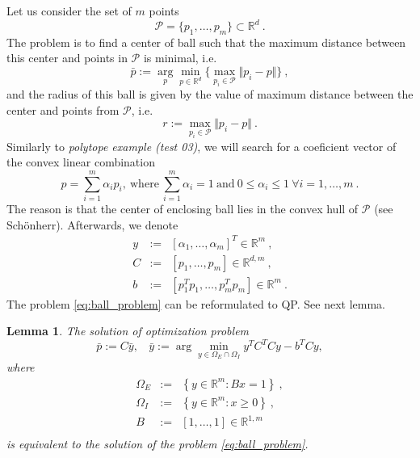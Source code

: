 \documentclass{article}
\theoremstyle{lemma}
\newtheorem{lemma}{Lemma}
\begin{document}
Let us consider the set of $m$ points
\begin{displaymath}
 \mathcal{P} = \lbrace p_1, \dots, p_m \rbrace \subset \mathbb{R}^d ~\mathrm{.}
\end{displaymath}
The problem is to find a center of ball such that the maximum distance between this center and points in $\mathcal{P}$ is minimal, i.e.
\begin{equation}
 \label{eq:ball_problem}
 \bar{p} := \underset{p}{\arg} \min\limits_{p \in \mathbb{R}^d} \lbrace \max\limits_{p_i \in \mathcal{P}} \Vert p_i - p \Vert  \rbrace ~\mathrm{,}
\end{equation}
and the radius of this ball is given by the value of maximum distance between the center and points from $\mathcal{P}$, i.e.
\begin{displaymath}
 r := \max\limits_{p_i \in \mathcal{P}} \Vert p_i - p \Vert ~\mathrm{.}
\end{displaymath}
Similarly to \emph{polytope example (test 03)}, we will search for a coeficient vector of the convex linear combination 
\begin{displaymath}
 p = \sum\limits_{i = 1}^{m} \alpha_{i} p_i, ~ \mathrm{where} ~ \sum\limits_{i = 1}^{m} \alpha_i = 1 ~ \mathrm{and} ~ 0 \leq \alpha_i \leq 1 ~\forall i = 1,\dots,m  ~\mathrm{.}
\end{displaymath}
The reason is that the center of enclosing ball lies in the convex hull of $\mathcal{P}$ (see Sch\"{o}nherr). \newline
Afterwards, we denote
\begin{displaymath}
 \begin{array}{rcl}
  y & := & [\alpha_1, \dots, \alpha_m]^T \in \mathbb{R}^{m} ~\mathrm{,} \\
  C & := & [p_1,\dots,p_m] \in \mathbb{R}^{d,m} ~\mathrm{,} \\
  b & := & [p_1^T p_1, \dots, p_m^T p_m]  \in \mathbb{R}^{m} ~\mathrm{.} 
 \end{array}
\end{displaymath}
The problem \eqref{eq:ball_problem} can be reformulated to QP. See next lemma.
\begin{lemma}
The solution of optimization problem
\begin{displaymath}
 \bar{p} := C\bar{y}, ~~~~ \bar{y} := \arg \min\limits_{y \in \Omega_E \cap \Omega_I} y^T C^T C y - b^T C y,
\end{displaymath}
where
\begin{displaymath}
 \begin{array}{rcl}
  \Omega_E & := & \left\lbrace y \in \mathbb{R}^{m}: B x = 1 \right\rbrace ~\mathrm{,} \\
  \Omega_I & := & \left\lbrace y \in \mathbb{R}^{m}: x \geq 0 \right\rbrace ~\mathrm{,} \\
  B & := & [1,\dots,1] \in \mathbb{R}^{1,m} \\
 \end{array}
\end{displaymath}
is equivalent to the solution of the problem \eqref{eq:ball_problem}.
\end{lemma}
\end{document}
